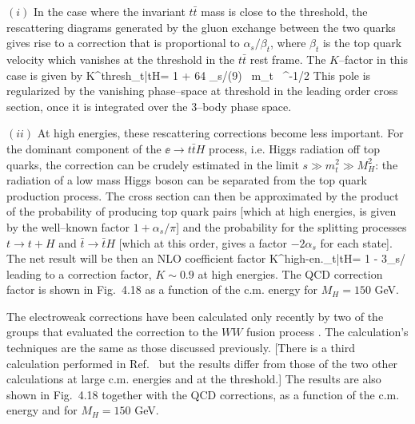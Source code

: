 {$(i)$ In the case where the invariant $t\bar{t}$ mass is close to the threshold,
the rescattering diagrams generated by the gluon exchange between the two
quarks gives rise to a correction that is proportional to $\alpha_s/\beta_t$, 
where $\beta_t$ is the top quark velocity which vanishes at the threshold in 
the $t\bar{t}$ rest frame. The $K$--factor in this case is given by
\cite{RCTTqcd1}
\beq
K^{\rm thresh}_{\ee \to t\bar{t}H}= 1 + 64 \alpha_s/(9\pi) \, \pi m_t \, 
^{-1/2}  
\eeq
This pole is regularized by the vanishing phase--space at threshold in the 
leading order cross section, once it is integrated over the 3--body phase 
space. \s

$(ii)$ At high energies, these rescattering corrections become less important.
For the dominant component of the $\ee \to t\bar{t}H$ process, i.e. Higgs
radiation off top quarks, the correction can be crudely estimated in the
limit $s \gg m_t^2 \gg M_H^2$: the radiation of a low mass Higgs boson can be 
separated from the top quark production process. The cross section can then 
be approximated by the product of the probability of producing top quark pairs 
[which at high energies, is given by the well--known factor $1+ \alpha_s/\pi$]  
and the probability for the splitting processes $t \to t+H$ and $\bar{t} 
\to \bar{t}H$ [which at this order, gives a factor $-2\alpha_s$ for each 
state]. The net result will be then an NLO coefficient factor \cite{RCTTqcd1}
\beq
K^{\rm high-en.}_{\ee \to t\bar{t}H}= 1 - 3\alpha_s/\pi
\eeq
leading to a correction factor, $K \sim 0.9$ at high energies. The QCD
correction factor is shown in Fig.~4.18 as a function of the c.m. 
energy for $M_H=150$ GeV. \s

The electroweak corrections have been calculated only recently by two of the
groups that evaluated the correction to the $WW$ fusion process
\cite{RCTTew1,RCTTew2}.  The calculation's techniques are the same as those
discussed previously.  [There is a third calculation performed in
Ref.~\cite{RCTTew0} but the results differ from those of the two other 
calculations at large c.m. energies and at the threshold.] The results are 
also shown in Fig.~4.18  together with the QCD corrections, as a function of 
the c.m. energy and for $M_H=150$ GeV.\s

}
